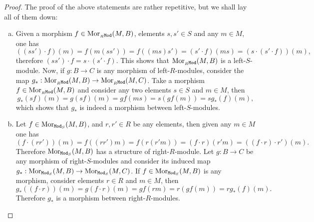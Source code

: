 \begin{proof}
    The proof of the above statements are rather repetitive, but we shall lay all of
    them down:
    \begin{enumerate}[(a)]\setlength\itemsep{0em}
        \item Given a morphism \(f \in \operatorname{Mor}_{{{}_{R}\texttt{Mod}}}(M, B)\), elements \(s, s' \in S\)
              and any \(m \in M\), one has
              \[
                  ((s s') \cdot f)(m)
                  = f(m (s s'))
                  = f((m s) s')
                  = (s' \cdot f)(m s)
                  = (s \cdot (s' \cdot f))(m),
              \]
              therefore \((s s') \cdot f = s \cdot (s' \cdot f)\). This shows that
              \(\operatorname{Mor}_{{{}_{R}\texttt{Mod}}}(M, B)\) is a left-\(S\)-module. Now, if \(g: B \to C\) is
              any morphism of left-\(R\)-modules, consider the map
              \(g_*: \operatorname{Mor}_{{{}_{R}\texttt{Mod}}}(M, B) \to \operatorname{Mor}_{{{}_{R}\texttt{Mod}}}(M, C)\). Take a morphism
              \(f \in \operatorname{Mor}_{{{}_{R}\texttt{Mod}}}(M, B)\) and consider any two elements \(s \in S\) and
              \(m \in M\), then
              \[
                  g_{*}(s f)(m) = g (s f)(m) = g f(m s) = s (g f(m)) = s g_{*}(f)(m),
              \]
              which shows that \(g_{*}\) is indeed a morphism between left-\(S\)-modules.

        \item Let \(f \in \operatorname{Mor}_{{\texttt{Mod}_{S}}}(M, B)\), and \(r, r' \in R\) be any elements,
              then given any \(m \in M\) one has
              \[
                  (f \cdot (r r'))(m)
                  = f((r r') m)
                  = f(r (r' m))
                  = (f \cdot r) (r' m)
                  = ((f \cdot r) \cdot r')(m).
              \]
              Therefore \(\operatorname{Mor}_{{\texttt{Mod}_{S}}}(M, B)\) has a structure of right-\(R\)-module. Let
              \(g: B \to C\) be any morphism of right-\(S\)-modules and consider its induced
              map \(g_{*}: \operatorname{Mor}_{{\texttt{Mod}_{S}}}(M, B) \to \operatorname{Mor}_{{\texttt{Mod}_{S}}}(M, C)\). If
              \(f \in \operatorname{Mor}_{{\texttt{Mod}_{S}}}(M, B)\) is any morphism, consider elements
              \(r \in R\) and \(m \in M\), then
              \[
                  g_{*}((f \cdot r))(m)
                  = g (f \cdot r)(m)
                  = g f(r m)
                  = r (g f(m))
                  = r g_{*}(f)(m).
              \]
              Therefore \(g_{*}\) is a morphism between right-\(R\)-modules.


\end{enumerate}
\end{proof}
